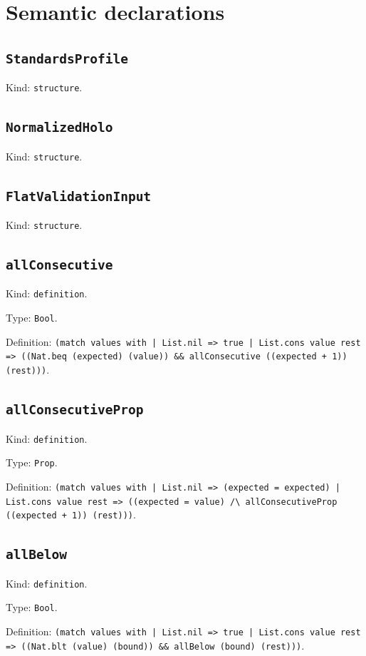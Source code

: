 \documentclass[11pt]{article}
\begin{document}
\section*{Semantic declarations}
\subsection*{\texttt{StandardsProfile}}
\noindent Kind: \texttt{structure}.\par
\subsection*{\texttt{NormalizedHolo}}
\noindent Kind: \texttt{structure}.\par
\subsection*{\texttt{FlatValidationInput}}
\noindent Kind: \texttt{structure}.\par
\subsection*{\texttt{allConsecutive}}
\noindent Kind: \texttt{definition}.\par
\noindent Type: \texttt{Bool}.\par
\noindent Definition: \texttt{(match values with | List.nil => true | List.cons value rest => ((Nat.beq (expected) (value)) \&\& allConsecutive ((expected + 1)) (rest)))}.\par
\subsection*{\texttt{allConsecutiveProp}}
\noindent Kind: \texttt{definition}.\par
\noindent Type: \texttt{Prop}.\par
\noindent Definition: \texttt{(match values with | List.nil => (expected = expected) | List.cons value rest => ((expected = value) /\textbackslash{} allConsecutiveProp ((expected + 1)) (rest)))}.\par
\subsection*{\texttt{allBelow}}
\noindent Kind: \texttt{definition}.\par
\noindent Type: \texttt{Bool}.\par
\noindent Definition: \texttt{(match values with | List.nil => true | List.cons value rest => ((Nat.blt (value) (bound)) \&\& allBelow (bound) (rest)))}.\par
\end{document}
